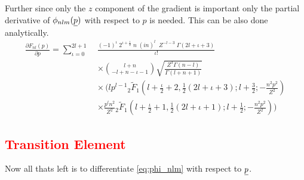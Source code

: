 Further since only the $z$ component of the gradient is important only the partial derivative of $\phi_{nlm}(\underline{p})$ with respect to $p$ is needed.
This can be also done analytically.
\begin{align*}
    \frac{\partial F_{nl}(p)}{\partial p} = \sum_{\iota=0}^{2l+1} \;
        & \frac{(-1)^{\iota} \; 2^{\iota + \frac{1}{2}} \; n \; (i n)^l \; \; Z^{-l-3} \; \Gamma(2l+\iota+3)}{\iota!} \nonumber \\
        & \times \binom{l+n}{-l+n-\iota-1} 
        \sqrt{\frac{Z^3 \Gamma(n-l)}{\Gamma(l+n+1)}} \nonumber \\
        & \times  \,
        (lp^{l-1}{}_2\tilde{F}_1\left(l+\frac{\iota}{2}+2, \frac{1}{2}(2l+\iota+3); l+\frac{3}{2}; -\frac{n^2 p^2}{Z^2}\right)\\
        &\times\frac{p^ln^2}{Z^2}{}_2\tilde{F}_1\left(l+\frac{\iota}{2}+1, \frac{1}{2}(2l+\iota+1); l+\frac{1}{2}; -\frac{n^2 p^2}{Z^2}\right))
\end{align*}



\subsection*{\textcolor{red}{Transition Element}}
Now all thats left is to differentiate \eqref{eq:phi_nlm} with respect to $\underline{p}$. 


